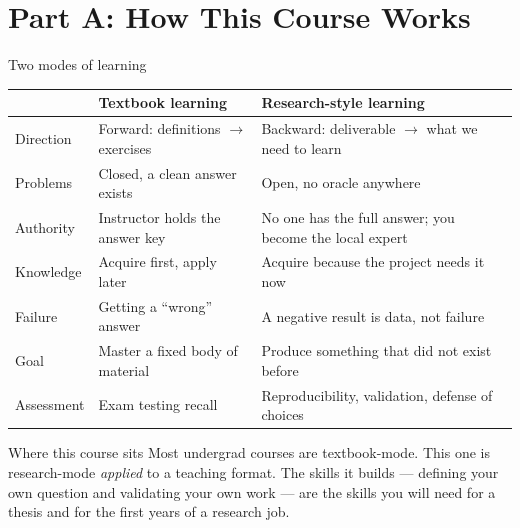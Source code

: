 \documentclass[aspectratio=169,10pt]{beamer}
\begin{document}
\section*{Part A: How This Course Works}

\begin{frame}{Two modes of learning}
\centering
\scriptsize
\begin{tabular}{p{} p{} p{}}
\toprule
 & \textbf{Textbook learning} & \textbf{Research-style learning} \\
\midrule
Direction & Forward: definitions $\rightarrow$ exercises & Backward: deliverable $\rightarrow$ what we need to learn \\[2pt]
Problems & Closed, a clean answer exists & Open, no oracle anywhere \\[2pt]
Authority & Instructor holds the answer key & No one has the full answer; you become the local expert \\[2pt]
Knowledge & Acquire first, apply later & Acquire because the project needs it now \\[2pt]
Failure & Getting a ``wrong'' answer & A negative result is data, not failure \\[2pt]
Goal & Master a fixed body of material & Produce something that did not exist before \\[2pt]
Assessment & Exam testing recall & Reproducibility, validation, defense of choices \\
\bottomrule
\end{tabular}
\vspace{0.7em}
\normalsize
\begin{block}{Where this course sits}
Most undergrad courses are textbook-mode. This one is research-mode \emph{applied} to a teaching format. The skills it builds --- defining your own question and validating your own work --- are the skills you will need for a thesis and for the first years of a research job.
\end{block}
\end{frame}
\end{document}
